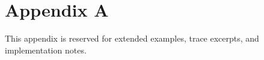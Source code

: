 \section*{Appendix A}

This appendix is reserved for extended examples, trace excerpts, and implementation notes.
